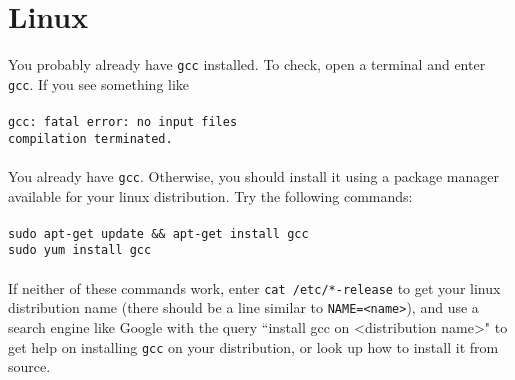 \documentclass{article}
\begin{document}
\section*{Linux}
You probably already have \verb|gcc| installed. To check, open a terminal and enter \verb|gcc|. 
If you see something like \\ \\
\verb|gcc: fatal error: no input files| \\
\verb|compilation terminated.| \\ \\
You already have \verb|gcc|. Otherwise, you should install it using a package manager available for your
linux distribution. Try the following commands: \\ \\
\verb|sudo apt-get update && apt-get install gcc| \\
\verb|sudo yum install gcc| \\ \\
If neither of these commands work, enter \verb|cat /etc/*-release| to get your linux distribution name
(there should be a line similar to \verb|NAME=<name>|), and use
a search engine like Google with the query ``install gcc on \textless distribution name\textgreater" to get help on installing
\verb|gcc| on your distribution, or look up how to install it from source.
\end{document}
